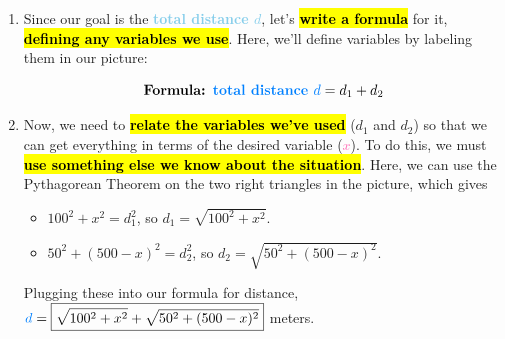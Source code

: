 \documentclass{article}
\newenvironment{noanswer}{}{}
\newcommand{\goal}[1]{\textbf{\textcolor{skyblue}{#1}}}
\newcommand{\indvar}[1]{\textbf{\textcolor{hotpink}{#1}}}
\theoremstyle{theorem}
\begin{document}
\begin{enumerate}
\begin{enumerate}
\begin{solution}
\begin{noanswer}
\begin{enumerate}[label=\arabic*.]
        \item Since our goal is the \goal{total distance $d$}, let's \hl{\textbf{write a formula}} for it, \hl{\textbf{defining any variables we use}}. Here, we'll define variables by labeling them in our picture:
          \begin{center}
          \end{center}
          \[ \text{\textbf{Formula: }} \goal{total distance $d$} = d_1 + d_2 \]

        \item Now, we need to \hl{\textbf{relate the variables we've used}} ($d_1$ and $d_2$) so that we can get everything in terms of the desired variable (\indvar{$x$}). To do this, we must \hl{\textbf{use something else we know about the situation}}. Here, we can use the Pythagorean Theorem on the two right triangles in the picture, which gives
          \begin{itemize}
          \item $100^2 + x^2 = d_1^2$, so $d_1 = \sqrt{100^2 + x^2}$.
          \item $50^2 + (500 - x)^2 = d_2^2$, so $d_2 = \sqrt{50^2 + (500 - x)^2}$.
          \end{itemize}
          Plugging these into our formula for distance, $\goal{$d$} = \boxed{\sqrt{100^2 + x^2} + \sqrt{50^2 + (500 - x)^2}}$ meters.
        \end{enumerate}
      \end{noanswer}  
    \end{solution}


\end{enumerate}
\end{enumerate}
\end{document}
